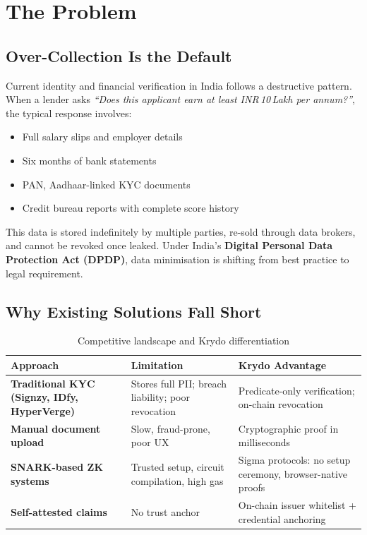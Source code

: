 \documentclass[11pt,a4paper]{article}
\newcommand{\krydo}{\textsf{Krydo}}
\begin{document}
\section{The Problem}

\subsection{Over-Collection Is the Default}

Current identity and financial verification in India follows a destructive pattern. When a lender asks \emph{``Does this applicant earn at least INR\,10\,Lakh per annum?''}, the typical response involves:

\begin{itemize}
  \item Full salary slips and employer details
  \item Six months of bank statements
  \item PAN, Aadhaar-linked KYC documents
  \item Credit bureau reports with complete score history
\end{itemize}

This data is stored indefinitely by multiple parties, re-sold through data brokers, and cannot be revoked once leaked. Under India's \textbf{Digital Personal Data Protection Act (DPDP)}, data minimisation is shifting from best practice to legal requirement.

\subsection{Why Existing Solutions Fall Short}

\begin{table}[H]
  \centering
  \caption{Competitive landscape and \krydo{} differentiation}
  \renewcommand{\arraystretch}{1.25}
  \begin{tabularx}{\textwidth}{@{}>{\bfseries}p{2.8cm} X X@{}}
    \toprule
    Approach & Limitation & \krydo{} Advantage \\
    \midrule
    Traditional KYC (Signzy, IDfy, HyperVerge) & Stores full PII; breach liability; poor revocation & Predicate-only verification; on-chain revocation \\
    Manual document upload & Slow, fraud-prone, poor UX & Cryptographic proof in milliseconds \\
    SNARK-based ZK systems & Trusted setup, circuit compilation, high gas & Sigma protocols: no setup ceremony, browser-native proofs \\
    Self-attested claims & No trust anchor & On-chain issuer whitelist + credential anchoring \\
    \bottomrule
  \end{tabularx}
\end{table}
\end{document}
